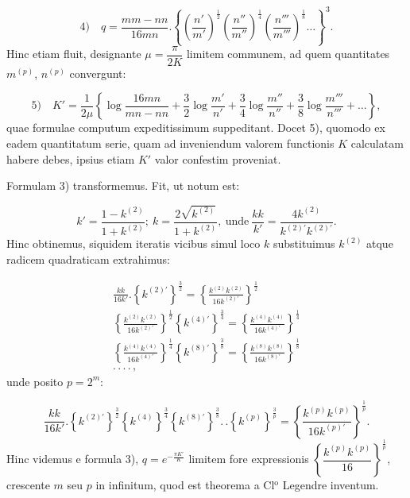 \documentclass{article}
\begin{document}
\[
\text{4)}\quad q=\frac{mm-nn}{16mn}.\left\{\left(\frac{n'}{m'}\right)^{\frac{1}{2}}\left(\frac{n''}{m''}\right)^{\frac{1}{4}}\left(\frac{n'''}{m'''}\right)^{\frac{1}{8}}\ldots\right\}^{3}.
\]
Hinc etiam fluit, designante $\mu=\dfrac{\pi}{2K}$ limitem communem, ad quem quantitates $m^{(p)}$, $n^{(p)}$ convergunt:

\[
\text{5)}\quad K'=\frac{1}{2\mu}\left\{\log\frac{16mn}{mn-nn}+\frac{3}{2}\log\frac{m'}{n'}+\frac{3}{4}\log\frac{m''}{n''}+\frac{3}{8}\log\frac{m'''}{n'''}+\ldots\right\},
\]
quae formulae computum expeditissimum suppeditant. Docet 5), quomodo ex eadem quantitatum serie, quam ad inveniendum valorem functionis $K$ calculatam habere debes, ipsius etiam $K'$ valor confestim proveniat.

Formulam 3) transformemus. Fit, ut notum est:

\[
k'=\frac{1-k^{(2)}}{1+k^{(2)}};\ k=\frac{2\sqrt{k^{(2)}}}{1+k^{(2)}},\ \text{unde}\ \frac{kk}{k'}=\frac{4k^{(2)}}{k^{(2)\prime}k^{(2)\prime}}.
\]
Hinc obtinemus, siquidem iteratis vicibus simul loco $k$ substituimus $k^{(2)}$ atque radicem quadraticam extrahimus:

\[
\begin{gathered}
\frac{kk}{16k'}.\left\{k^{(2)\prime}\right\}^{\frac{3}{2}}=\left\{\frac{k^{(2)}k^{(2)}}{16k^{(2)\prime}}\right\}^{\frac{1}{2}}\\[1.5ex]
\left\{\frac{k^{(2)}k^{(2)}}{16k^{(2)\prime}}\right\}^{\frac{1}{2}}\left\{k^{(4)\prime}\right\}^{\frac{3}{4}}=\left\{\frac{k^{(4)}k^{(4)}}{16k^{(4)\prime}}\right\}^{\frac{1}{4}}\\[1.5ex]
\left\{\frac{k^{(4)}k^{(4)}}{16k^{(4)\prime}}\right\}^{\frac{1}{4}}\left\{k^{(8)\prime}\right\}^{\frac{3}{8}}=\left\{\frac{k^{(8)}k^{(8)}}{16k^{(8)\prime}}\right\}^{\frac{1}{8}}\\[1.5ex]
.\,.\,.\,.\,,
\end{gathered}
\]
unde posito $p=2^{m}$:

\[
\frac{kk}{16k'}.\left\{k^{(2)\prime}\right\}^{\frac{3}{2}}\left\{k^{(4)}\right\}^{\frac{3}{4}}\left\{k^{(8)\prime}\right\}^{\frac{3}{8}}.\,.\left\{k^{(p)}\right\}^{\frac{3}{p}}=\left\{\frac{k^{(p)}k^{(p)}}{16k^{(p)\prime}}\right\}^{\frac{1}{p}}.
\]
Hinc videmus e formula 3), $q=e^{-\frac{\pi K'}{K}}$ limitem fore expressionis $\left\{\dfrac{k^{(p)}k^{(p)}}{16}\right\}^{\frac{1}{p}}$, crescente $m$ seu $p$ in infinitum, quod est theorema a Cl$^{\mathrm{o}}$ Legendre inventum.
\end{document}
